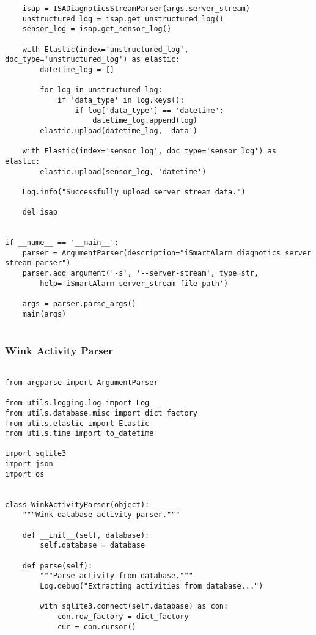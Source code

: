 \documentclass{easychair}
\begin{document}
\begin{enumerate}
\begin{lstlisting}
    isap = ISADiagnoticsStreamParser(args.server_stream)
    unstructured_log = isap.get_unstructured_log()
    sensor_log = isap.get_sensor_log()

    with Elastic(index='unstructured_log', doc_type='unstructured_log') as elastic:
        datetime_log = []

        for log in unstructured_log:
            if 'data_type' in log.keys():
                if log['data_type'] == 'datetime':
                    datetime_log.append(log)
        elastic.upload(datetime_log, 'data')

    with Elastic(index='sensor_log', doc_type='sensor_log') as elastic:
        elastic.upload(sensor_log, 'datetime')

    Log.info("Successfully upload server_stream data.")

    del isap


if __name__ == '__main__':
    parser = ArgumentParser(description="iSmartAlarm diagnotics server stream parser")
    parser.add_argument('-s', '--server-stream', type=str,
        help='iSmartAlarm server_stream file path')

    args = parser.parse_args()
    main(args)


\end{lstlisting}

\subsubsection{Wink Activity Parser}

\lstset{language=Python}
\lstset{frame=lines}
\lstset{basicstyle=\footnotesize}
\begin{lstlisting}

from argparse import ArgumentParser

from utils.logging.log import Log
from utils.database.misc import dict_factory
from utils.elastic import Elastic
from utils.time import to_datetime

import sqlite3
import json
import os


class WinkActivityParser(object):
    """Wink database activity parser."""

    def __init__(self, database):
        self.database = database

    def parse(self):
        """Parse activity from database."""
        Log.debug("Extracting activities from database...")

        with sqlite3.connect(self.database) as con:
            con.row_factory = dict_factory
            cur = con.cursor()


\end{lstlisting}
\end{enumerate}
\end{document}
